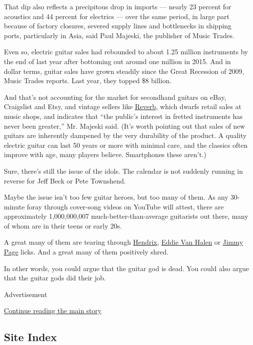 That dip also reflects a precipitous drop in imports --- nearly 23
percent for acoustics and 44 percent for electrics --- over the same
period, in large part because of factory closures, severed supply lines
and bottlenecks in shipping ports, particularly in Asia, said Paul
Majeski, the publisher of Music Trades.

Even so, electric guitar sales had rebounded to about 1.25 million
instruments by the end of last year after bottoming out around one
million in 2015. And in dollar terms, guitar sales have grown steadily
since the Great Recession of 2009, Music Trades reports. Last year, they
topped \$8 billion.

And that's not accounting for the market for secondhand guitars on eBay,
Craigslist and Etsy, and vintage sellers like
\href{https://reverb.com/}{Reverb}, which dwarfs retail sales at music
shops, and indicates that ``the public's interest in fretted instruments
has never been greater,'' Mr. Majeski said. (It's worth pointing out
that sales of new guitars are inherently dampened by the very durability
of the product. A quality electric guitar can last 50 years or more with
minimal care, and the classics often improve with age, many players
believe. Smartphones these aren't.)

Sure, there's still the issue of the idols. The calendar is not suddenly
running in reverse for Jeff Beck or Pete Townshend.

Maybe the issue isn't too few guitar heroes, but too many of them. As
any 30-minute foray through cover-song videos on YouTube will attest,
there are approximately 1,000,000,007 much-better-than-average
guitarists out there, many of whom are in their teens or early 20s.

A great many of them are tearing through
\href{https://www.youtube.com/watch?v=QUOn6YY6Kyc}{Hendrix},
\href{https://www.youtube.com/watch?v=1t9h-TlKF4k}{Eddie Van Halen} or
\href{https://www.youtube.com/watch?v=1t9h-TlKF4k}{Jimmy Page} licks.
And a great many of them positively shred.

In other words, you could argue that the guitar god is dead. You could
also argue that the guitar gods did their job.

Advertisement

\protect\hyperlink{after-bottom}{Continue reading the main story}

\hypertarget{site-index}{%
\subsection{Site Index}\label{site-index}}

